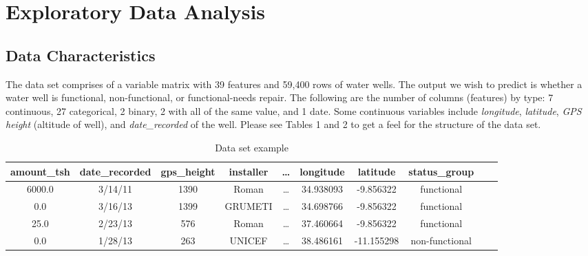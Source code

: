 \documentclass[10pt]{SelfArx} %
\begin{document}
\flushbottom %

\noindent \maketitle %


\tableofcontents %

\thispagestyle{empty} %


\section{Exploratory Data Analysis} %
\subsection{Data Characteristics}

The data set comprises of a variable matrix with 39 features and 59,400 rows of water wells. The output we wish to predict is whether a water well is functional, non-functional, or functional-needs repair. The following are the number of columns (features) by type: 7 continuous, 27 categorical, 2 binary, 2  with all of the same value, and 1 date. Some continuous variables include \textit{longitude}, \textit{latitude}, \textit{GPS height} (altitude of well), and \textit{date\_recorded} of the well. Please see Tables 1 and 2 to get a feel for the structure of the data set.
\break

\begin{table*}[t]
  \centering
\caption{Data set example}
\begin{tabular}{ |c|c|c|c|c|c|c|c|c|c| }
      \hline
      amount\_tsh & date\_recorded & gps\_height & installer & \ldots & longitude & latitude & status\_group\\
      \hline
      \hline
      6000.0 & 3/14/11 & 1390 & Roman & \ldots & 34.938093 & -9.856322 & functional\\
      0.0 & 3/16/13 & 1399 & GRUMETI & \ldots & 34.698766 & -9.856322 & functional\\
      25.0 & 2/23/13 & 576 & Roman & \ldots & 37.460664 & -9.856322 & functional\\
      0.0 & 1/28/13 & 263 & UNICEF & \ldots & 38.486161 & -11.155298 & non-functional\\
      \hline
    \end{tabular}
  \label{tab:1}
\end{table*}
\end{document}

